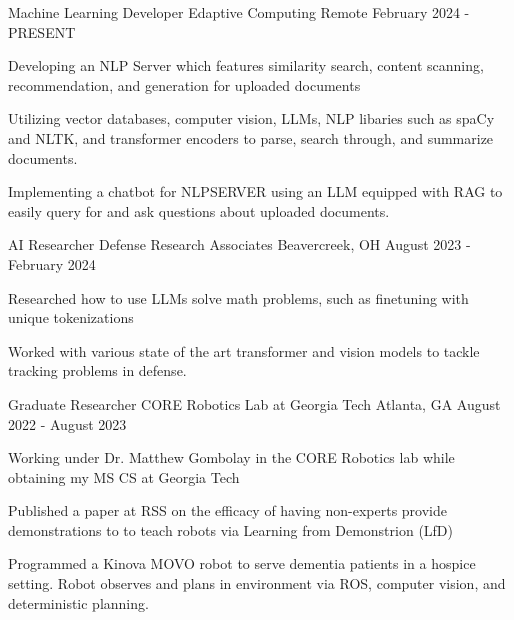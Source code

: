 
\begin{cventries}

\cventry
    {Machine Learning Developer} %
    {Edaptive Computing} %
    {Remote} %
    {February 2024 - PRESENT} %
    {
      \begin{cvitems} %
        \item {Developing an NLP Server which features similarity search, content scanning, recommendation, and generation for uploaded documents}
        \item {Utilizing vector databases, computer vision, LLMs, NLP libaries such as spaCy and NLTK, and transformer encoders to parse, search through, and summarize documents.}
        \item {Implementing a chatbot for NLPSERVER using an LLM equipped with RAG to easily query for and ask questions about uploaded documents.}
      \end{cvitems}
    }
    
\cventry
    {AI Researcher} %
    {Defense Research Associates} %
    {Beavercreek, OH} %
    {August 2023 - February 2024} %
    {
      \begin{cvitems} %
        \item {Researched how to use LLMs solve math problems, such as finetuning with unique tokenizations}
        \item {Worked with various state of the art transformer and vision models to tackle tracking problems in defense.}
      \end{cvitems}
    }

\cventry
    {Graduate Researcher} %
    {CORE Robotics Lab at Georgia Tech} %
    {Atlanta, GA} %
    {August 2022 - August 2023} %
    {
      \begin{cvitems} %
        \item {Working under Dr. Matthew Gombolay in the CORE Robotics lab while obtaining my MS CS at Georgia Tech}
        \item {Published a paper at RSS on the efficacy of having non-experts provide demonstrations to to teach robots via Learning from Demonstrion (LfD)}
        \item {Programmed a Kinova MOVO robot to serve dementia patients in a hospice setting. Robot observes and plans in environment via ROS, computer vision, and deterministic planning.}
      \end{cvitems}
    }


\end{cventries}
